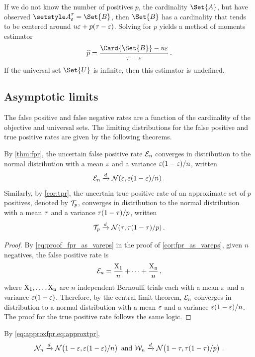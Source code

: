 \documentclass[10pt,final,hidelinks]{article}
\numberwithin{equation}{section}
\begin{document}
If we do not know the number of positives $p$, the cardinality $\Set{A}$, but have observed $\ASet{A}[\fprate][\tprate] = \Set{B}$, then $\Set{B}$ has a cardinality that tends to be centered around $u \varepsilon + p (\tau - \varepsilon)$.
Solving for $p$ yields a method of moments estimator
\begin{equation}
	\widehat{p} = \frac{\Card{\Set{B}} - u \fprate}{\tprate - \fprate}\,.
\end{equation}
If the universal set $\Set{U}$ is infinite, then this estimator is undefined.

\subsection{Asymptotic limits}
\label{sec:asymtotic}
The false positive and false negative rates are a function of the cardinality of the objective and universal sets.
The limiting distributions for the false positive and true positive rates are given by the following theorems.
\begin{theorem}
    \label{thm:approxfpr}
    By \cref{thm:fpr}, the uncertain false positive rate $\mathcal{E}_n$ converges in
    distribution to the normal distribution with a mean $\varepsilon$ and a 
    variance $\varepsilon(1-\varepsilon)/n$, written
    \begin{equation}
    \label{eq:approxfpr}
	    \mathcal{E}_n \xrightarrow{d} \mathcal{N}(\varepsilon, \varepsilon(1-\varepsilon) / n)\,.
    \end{equation}
    Similarly, by \cref{cor:tpr}, the uncertain true positive rate of an approximate  set of $p$ positives, denoted by $\mathcal{T}_p$, converges in distribution to the normal distribution with a mean $\tau$ and a variance $\tau(1-\tau)/p$, written
    \begin{equation}
    \label{eq:approxtpr}
    	\mathcal{T}_p \xrightarrow{d} \mathcal{N}(\tau, \tau(1-\tau) / p)\,.
    \end{equation}
\end{theorem}
\begin{proof}
    By \cref{eq:proof_fpr_as_vareps} in the proof of \cref{cor:fpr_as_vareps}, 
    given 
    $n$ negatives, the false positive rate is
    \begin{equation}
    	\mathcal{E}_n = \frac{\mathrm{X_1}}{n} + \cdots + \frac{\mathrm{X_n}}{n}\,,
    \end{equation}
    where $\mathrm{X_1},\ldots,\mathrm{X_n}$ are $n$ independent Bernoulli trials each with a mean $\varepsilon$ and a variance $\varepsilon(1-\varepsilon)$.
    Therefore, by the central limit theorem, $\mathcal{E}_n$ converges in distribution to a normal distribution with a mean $\varepsilon$  and a variance $\varepsilon(1-\varepsilon)/n$.
    The proof for the true positive rate follows the same logic.
\end{proof}
By \cref{eq:approxfpr,eq:approxtpr},
\begin{equation}
	\mathcal{N}_n \xrightarrow{d} \mathcal{N}\!\left(1-\varepsilon, \varepsilon(1-\varepsilon) / n\right) \text{ and } \mathcal{W}_n \xrightarrow{d} \mathcal{N}\!\left(1-\tau, \tau(1-\tau) / p\right)\,.	
\end{equation}
\end{document}
